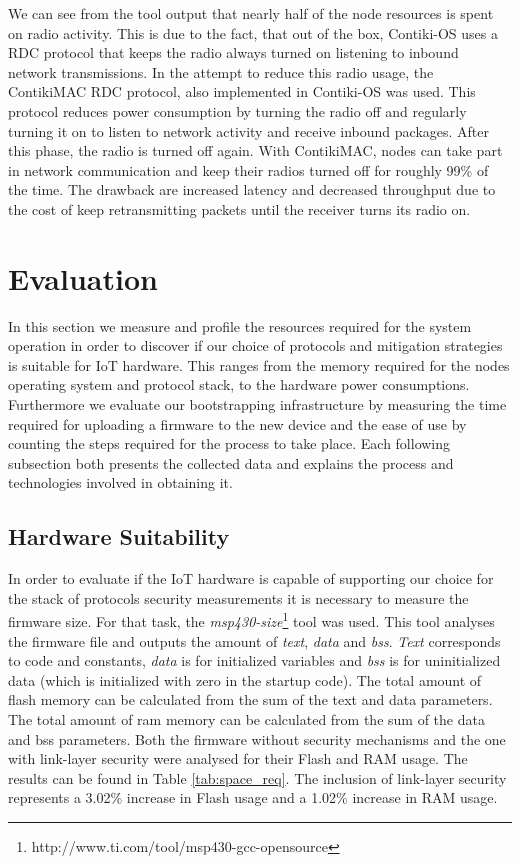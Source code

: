 \documentclass{sig-alternate-05-2015}
\begin{document}
We can see from the tool output that nearly half of the node resources is spent on radio activity. This is due to the fact, that out of the box, Contiki-OS uses a \gls{RDC} protocol that keeps the radio always turned on listening to inbound network transmissions. In the attempt to reduce this radio usage, the ContikiMAC\cite{Dunkels2011} \gls{RDC} protocol, also implemented in Contiki-OS was used.
This protocol reduces power consumption by turning the radio off and regularly turning it on to listen to network activity and receive inbound packages. After this phase, the radio is turned off again. With ContikiMAC, nodes can take part in network communication and keep their radios turned off for roughly 99\% of the time\cite{Dunkels2011}. The drawback are increased latency and decreased throughput due to the cost of keep retransmitting packets until the receiver turns its radio on.


\section{Evaluation}
\label{sec:evaluation}
In this section we measure and profile the resources required for the system operation in order to discover if our choice of protocols and mitigation strategies is suitable for \gls{IoT} hardware. This ranges from the memory required for the nodes operating system and protocol stack, to the hardware power consumptions. Furthermore we evaluate our bootstrapping infrastructure by measuring the time required for uploading a firmware to the new device and the ease of use by counting the steps required for the process to take place. Each following subsection both presents the collected data and explains the process and technologies involved in obtaining it.

\subsection{Hardware Suitability}
In order to evaluate if the \gls{IoT} hardware is capable of supporting our choice for the stack of protocols security measurements it is necessary to measure the firmware size. For that task, the \textit{msp430-size}\footnote{http://www.ti.com/tool/msp430-gcc-opensource} tool was used. This tool analyses the firmware file and outputs the amount of \textit{text}, \textit{data} and \textit{bss}.
\textit{Text} corresponds to code and constants, \textit{data} is for initialized variables and \textit{bss} is for uninitialized data (which is initialized with zero in the startup code).
The total amount of flash memory can be calculated from the sum of the text and data parameters.
The total amount of ram memory can be calculated from the sum of the data and bss parameters.
Both the firmware without security mechanisms and the one with link-layer security were analysed for their Flash and RAM usage. The results can be found in Table \ref{tab:space_req}. The inclusion of link-layer security represents a 3.02\% increase in Flash usage and a 1.02\% increase in RAM usage.
\end{document}

